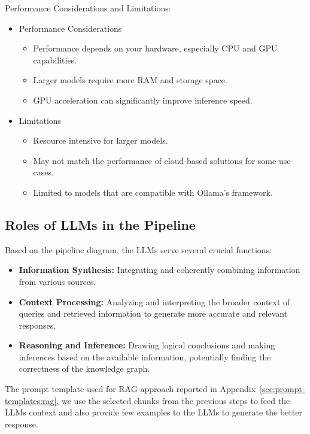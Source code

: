 Performance Considerations and Limitations:
\begin{itemize}
    \item Performance Considerations
    \begin{itemize}
        \item Performance depends on your hardware, especially CPU and GPU capabilities.
        \item Larger models require more RAM and storage space.
        \item GPU acceleration can significantly improve inference speed.
    \end{itemize}
    \item Limitations
    \begin{itemize}
        \item Resource intensive for larger models.
        \item May not match the performance of cloud-based solutions for some use cases.
        \item Limited to models that are compatible with Ollama's framework.
    \end{itemize}
\end{itemize}

\subsection{Roles of LLMs in the Pipeline}\label{subsec:roles-of-llms-in-the-pipeline}
Based on the pipeline diagram, the LLMs serve several crucial functions:
\begin{itemize}
    \item \textbf{Information Synthesis:} Integrating and coherently combining information from various sources.
    \item \textbf{Context Processing:} Analyzing and interpreting the broader context of queries and retrieved information to generate more accurate and relevant responses.
    \item \textbf{Reasoning and Inference:} Drawing logical conclusions and making inferences based on the available information, potentially finding the correctness of the knowledge graph.
\end{itemize}

The prompt template used for RAG approach reported in Appendix~\ref{sec:prompt-templates:rag}, we use the selected chunks from the previous steps to feed the LLMs context and also provide few examples to the LLMs to generate the better response.

